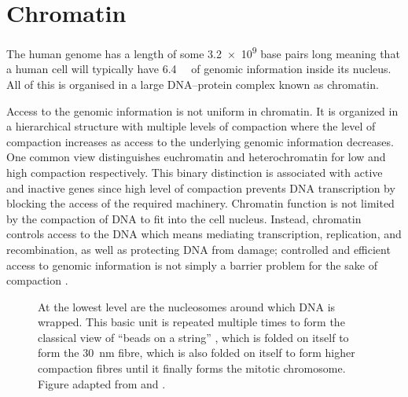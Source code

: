 \section{Chromatin}

  The human genome has a length of some \num{3.2e9}
  base pairs long \citep{nature-first-human-genome-draft}
  meaning that a human cell will
  typically have \SI{6.4}{\giga\bp} of genomic information inside
  its nucleus.
  All of this is organised in a large DNA--protein complex known as chromatin.

  Access to the genomic information is not uniform in chromatin.
  It is organized in a hierarchical structure with
  multiple levels of compaction  where
  the level of compaction increases as access to the underlying genomic
  information decreases.
  One common view distinguishes
  euchromatin and heterochromatin for low and
  high compaction respectively.
  This binary distinction is associated with active and inactive genes
  since high level of compaction prevents DNA transcription by blocking
  the access of the required machinery\addref{}.
  Chromatin function is not limited by the compaction of DNA
  to fit into the cell nucleus.
  Instead, chromatin controls access
  to the DNA which means mediating transcription, replication,
  and recombination, as
  well as protecting DNA from damage; controlled and efficient
  access to genomic information is not simply a barrier problem for the sake
  of compaction \citep{controlling-double-helix}.

  \begin{figure}
    \centering
    \def\svgwidth{\textwidth}
                 {At the lowest level are the nucleosomes around which
                  DNA is wrapped.
                  This basic unit is repeated multiple times to form
                  the classical view of ``beads on a string''
                  ,
                  which is folded on itself to form the
                  \SI{30}{\nano\meter} fibre,
                  which is also folded on itself to form higher
                  compaction fibres until it finally forms the
                  mitotic chromosome.
                  Figure adapted from \cite{alberts} and \cite{lodish}.}
    \label{fig:intro:chromatin-structure}
  \end{figure}

